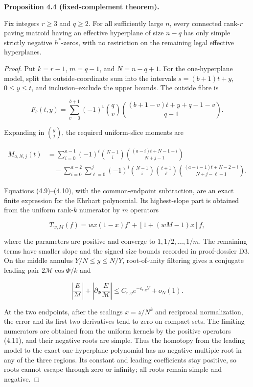 \documentclass[10pt]{article}
\newenvironment{mdstatement}[1]
  {\par\Needspace{0.16\textheight}\noindent\textbf{#1.}\ \itshape}
  {\par\normalfont}
\begin{document}
\begin{mdstatement}{Proposition 4.4 (fixed-complement theorem)}


Fix integers $r\ge3$ and $q\ge2$.  For all sufficiently large $n$,
every connected rank-$r$ paving matroid having an effective hyperplane of
size $n-q$ has only simple strictly negative $h^*$-zeros, with no
restriction on the remaining legal effective hyperplanes.

\end{mdstatement}

\begin{proof}


Put $k=r-1$, $m=q-1$, and $N=n-q+1$.  For the one-hyperplane model,
split the outside-coordinate sum into the intervals
$s=(b+1)t+y$, $0\le y\le t$, and inclusion--exclude the upper bounds.
The outside fibre is

\[
 F_b(t,y)=\sum_{v=0}^{b+1}(-1)^v\binom qv
 \binom{(b+1-v)t+y+q-1-v}{q-1}. \tag{4.9}
\]

Expanding in $\binom yj$, the required uniform-slice moments are

\[
\begin{aligned}
 M_{a,N,j}(t)
 &=\sum_{i=0}^{a-1}(-1)^i\binom{N-1}{i}
   \binom{(a-i)t+N-1-i}{N+j-1}\\
 &\quad-
 \sum_{i=0}^{a-2}\sum_{\ell=0}^{j}(-1)^i\binom{N-1}{i}
 \binom{t+1}{\ell}
 \binom{(a-i-1)t+N-2-i}{N+j-\ell-1}.
\end{aligned}
\tag{4.10}
\]

Equations (4.9)--(4.10), with the common-endpoint subtraction, are an exact
finite expression for the Ehrhart polynomial.  Its highest-slope part is
obtained from the uniform rank-$k$ numerator by $m$ operators

\[
 T_{w,M}(f)=wx(1-x)f'+[1+(wM-1)x]f, \tag{4.11}
\]

where the parameters are positive and converge to $1,1/2,\ldots,1/m$.
The remaining terms have smaller slope and the signed size bounds recorded in
proof-dossier D3.  On the middle annulus $Y/N\le y\le N/Y$, root-of-unity
filtering gives a conjugate leading pair $2\mathcal M\cos\Phi/k$ and

\[
 \left|\frac{E}{\mathcal M}\right|
 +\left|\partial_\Phi\frac{E}{\mathcal M}\right|
 \le C_{r,q}e^{-c_{r,q}Y}+o_N(1). \tag{4.12}
\]

At the two endpoints, after the scalings $x=z/N^k$ and reciprocal
normalization, the error and its first two derivatives tend to zero on compact
sets.  The limiting numerators are obtained from the uniform kernels by the
positive operators (4.11), and their negative roots are simple.  Thus the
homotopy from the leading model to the exact one-hyperplane polynomial has no
negative multiple root in any of the three regions.  Its constant and leading
coefficients stay positive, so roots cannot escape through zero or infinity;
all roots remain simple and negative.


\end{proof}
\end{document}
